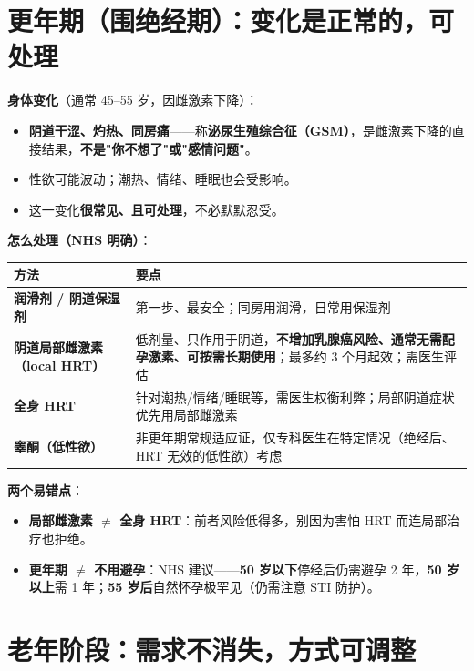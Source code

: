 \documentclass[12pt,UTF8,openany]{ctexbook}
\begin{document}
\section{更年期（围绝经期）：变化是正常的，可处理}

\textbf{身体变化}（通常 45--55 岁，因雌激素下降）：

\begin{itemize}[leftmargin=2em,itemsep=0.3em]
  \item \textbf{阴道干涩、灼热、同房痛}——称\textbf{泌尿生殖综合征（GSM）}，是雌激素下降的直接结果，\textbf{不是"你不想了"或"感情问题"}。
  \item 性欲可能波动；潮热、情绪、睡眠也会受影响。
  \item 这一变化\textbf{很常见、且可处理}，不必默默忍受。
\end{itemize}

\textbf{怎么处理（NHS 明确）}：

\begin{tabularx}{\linewidth}{X X}
\toprule
\textbf{方法} & \textbf{要点} \\
\midrule
\textbf{润滑剂 / 阴道保湿剂} & 第一步、最安全；同房用润滑，日常用保湿剂 \\
\textbf{阴道局部雌激素（local HRT）} & 低剂量、只作用于阴道，\textbf{不增加乳腺癌风险、通常无需配孕激素、可按需长期使用}；最多约 3 个月起效；需医生评估 \\
\textbf{全身 HRT} & 针对潮热/情绪/睡眠等，需医生权衡利弊；局部阴道症状优先用局部雌激素 \\
\textbf{睾酮（低性欲）} & 非更年期常规适应证，仅专科医生在特定情况（绝经后、HRT 无效的低性欲）考虑 \\
\bottomrule
\end{tabularx}

\vspace{0.5em}
\textbf{两个易错点}：

\begin{itemize}[leftmargin=2em,itemsep=0.3em]
  \item \textbf{局部雌激素 $\ne$ 全身 HRT}：前者风险低得多，别因为害怕 HRT 而连局部治疗也拒绝。
  \item \textbf{更年期 $\ne$ 不用避孕}：NHS 建议——\textbf{50 岁以下}停经后仍需避孕 2 年，\textbf{50 岁以上}需 1 年；\textbf{55 岁后}自然怀孕极罕见（仍需注意 STI 防护）。
\end{itemize}

\section{老年阶段：需求不消失，方式可调整}
\end{document}
